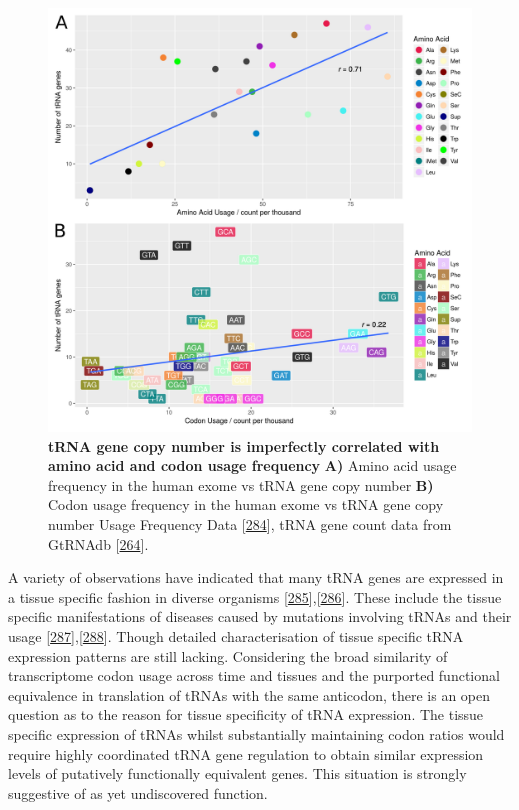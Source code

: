 \documentclass[
]{book}
\begin{document}
\begin{figure}

{\centering \includegraphics[width=0.6\linewidth]{./figs/codonAndaaFreqNtRNAplots} 

}

\caption{\textbf{tRNA gene copy number is imperfectly correlated with amino acid and codon usage frequency} \textbf{A)} Amino acid usage frequency in the human exome vs tRNA gene copy number \textbf{B)} Codon usage frequency in the human exome vs tRNA gene copy number Usage Frequency Data {[}\protect\hyperlink{ref-Athey2017}{284}{]}, tRNA gene count data from GtRNAdb {[}\protect\hyperlink{ref-Chan2009}{264}{]}.}\label{fig:codonAndaaFreqNtRNAplots}
\end{figure}



A variety of observations have indicated that many tRNA genes are expressed in a tissue specific fashion in diverse organisms {[}\protect\hyperlink{ref-Dittmar2006}{285}{]},{[}\protect\hyperlink{ref-Sagi2016}{286}{]}.
These include the tissue specific manifestations of diseases caused by mutations involving tRNAs and their usage {[}\protect\hyperlink{ref-Kirchner2017}{287}{]},{[}\protect\hyperlink{ref-Ishimura2015}{288}{]}.
Though detailed characterisation of tissue specific tRNA expression patterns are still lacking.
Considering the broad similarity of transcriptome codon usage across time and tissues and the purported functional equivalence in translation of tRNAs with the same anticodon, there is an open question as to the reason for tissue specificity of tRNA expression.
The tissue specific expression of tRNAs whilst substantially maintaining codon ratios would require highly coordinated tRNA gene regulation to obtain similar expression levels of putatively functionally equivalent genes. This situation is strongly suggestive of as yet undiscovered function.
\end{document}
